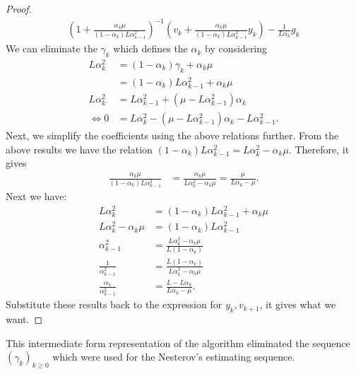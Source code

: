 \documentclass[12pt]{article}
\begin{document}
\begin{proof}
\begin{align*}
            \left(
                1 + \frac{\alpha_k\mu}{(1 -\alpha_k)L\alpha_{k - 1}^2}
            \right)^{-1}
            \left(
                v_k + 
                \frac{\alpha_k\mu}{(1 - \alpha_k)L\alpha_{k - 1}^2} y_k
            \right)
            - \frac{1}{L\alpha_{k}} g_k
        \end{align*}
        We can eliminate the $\gamma_k$ which defines the $\alpha_k$ by considering 
        \begin{align*}
            L\alpha_k^2 &= 
            (1 - \alpha_k)\gamma_k + \alpha_k \mu 
            \\
            &= 
            (1 - \alpha_k)L\alpha_{k - 1}^2 
            + \alpha_k \mu
            \\
            L\alpha_k^2 &= 
            L \alpha_{k - 1}^2 + 
            (\mu - L \alpha_{k - 1}^2)\alpha_k
            \\
            \iff     
            0
            &=  
            L \alpha_k^2 - (\mu - L \alpha_{k - 1}^2)\alpha_k 
            - L \alpha_{k -1}^2. 
        \end{align*}
        Next, we simplify the coefficients using the above relations further. 
        From the above results we have the relation $(1 - \alpha_k)L\alpha_{k - 1}^2 = L \alpha_k^2 - \alpha_k \mu$. 
        Therefore,  it gives 
        \begin{align*}
            \frac{\alpha_k\mu}{(1 - \alpha_k)L \alpha_{k - 1}^2}
            &= 
            \frac{\alpha_k\mu}{L \alpha_k^2 - \alpha_k \mu}
            = \frac{\mu}{L \alpha_k - \mu}. 
        \end{align*}
        Next we have: 
        \begin{align*}
            L\alpha_k^2 &= 
            (1 - \alpha_k)L\alpha_{k - 1}^2 + \alpha_k \mu 
            \\
            L \alpha_k^2 - \alpha_k\mu &= 
            (1 - \alpha_k)L \alpha_{k - 1}^2
            \\
            \alpha_{k - 1}^2
            &= 
            \frac{L \alpha_k^2 - \alpha_k\mu}{L (1 - \alpha_k)}
            \\
            \frac{1}{\alpha_{k - 1}^2}
            &= 
            \frac{L (1 - \alpha_k)}{L \alpha_k^2 - \alpha_k\mu}
            \\
            \frac{\alpha_k}{\alpha_{k - 1}^2}
            &= 
            \frac{L - L\alpha_k}{L\alpha_k - \mu}. 
        \end{align*}
        Substitute these results back to the expression for $y_k, v_{k + 1}$, it gives what we want. 

    \end{proof}
    \begin{remark}
        This intermediate form representation of the algorithm eliminated the sequence $(\gamma_k)_{k \ge0}$ which were used for the Nesterov's estimating sequence. 
    \end{remark}
\end{document}
